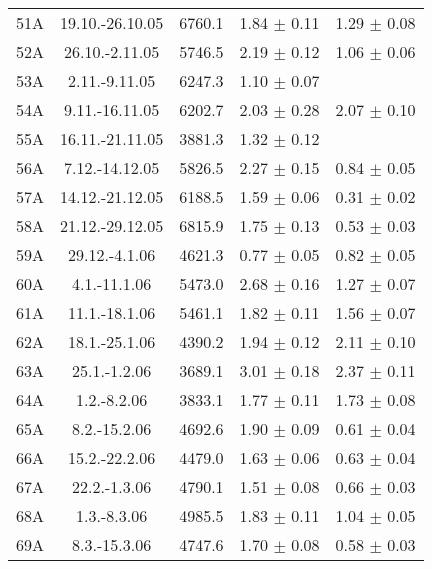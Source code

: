 \documentclass[a4paper,12pt]{article}
\begin{document}
\begin{center}
\begin{longtable}{|c|c|c|c|c|}
    51A &       19.10.-26.10.05 &       6760.1  &       1.84 $\pm$ 0.11 &       1.29 $\pm$ 0.08 \\
    52A &       26.10.-2.11.05  &       5746.5  &       2.19 $\pm$ 0.12 &       1.06 $\pm$ 0.06 \\
    53A &       2.11.-9.11.05   &       6247.3  &       1.10 $\pm$ 0.07 &                       \\
    54A &       9.11.-16.11.05  &       6202.7  &       2.03 $\pm$ 0.28 &       2.07 $\pm$ 0.10 \\
    55A &       16.11.-21.11.05 &       3881.3  &       1.32 $\pm$ 0.12 &                       \\
    56A &       7.12.-14.12.05  &       5826.5  &       2.27 $\pm$ 0.15 &       0.84 $\pm$ 0.05 \\
    57A &       14.12.-21.12.05 &       6188.5  &       1.59 $\pm$ 0.06 &       0.31 $\pm$ 0.02 \\
    58A &       21.12.-29.12.05 &       6815.9  &       1.75 $\pm$ 0.13 &       0.53 $\pm$ 0.03 \\
    59A &       29.12.-4.1.06   &       4621.3  &       0.77 $\pm$ 0.05 &       0.82 $\pm$ 0.05 \\
    60A &       4.1.-11.1.06    &       5473.0  &       2.68 $\pm$ 0.16 &       1.27 $\pm$ 0.07 \\
    61A &       11.1.-18.1.06   &       5461.1  &       1.82 $\pm$ 0.11 &       1.56 $\pm$ 0.07 \\
    62A &       18.1.-25.1.06   &       4390.2  &       1.94 $\pm$ 0.12 &       2.11 $\pm$ 0.10 \\
    63A &       25.1.-1.2.06    &       3689.1  &       3.01 $\pm$ 0.18 &       2.37 $\pm$ 0.11 \\
    64A &       1.2.-8.2.06     &       3833.1  &       1.77 $\pm$ 0.11 &       1.73 $\pm$ 0.08 \\
    65A &       8.2.-15.2.06    &       4692.6  &       1.90 $\pm$ 0.09 &       0.61 $\pm$ 0.04 \\
    66A &       15.2.-22.2.06   &       4479.0  &       1.63 $\pm$ 0.06 &       0.63 $\pm$ 0.04 \\
    67A &       22.2.-1.3.06    &       4790.1  &       1.51 $\pm$ 0.08 &       0.66 $\pm$ 0.03 \\
    68A &       1.3.-8.3.06     &       4985.5  &       1.83 $\pm$ 0.11 &       1.04 $\pm$ 0.05 \\
    69A &       8.3.-15.3.06    &       4747.6  &       1.70 $\pm$ 0.08 &       0.58 $\pm$ 0.03 \\

\end{longtable}
\end{center}
\end{document}
